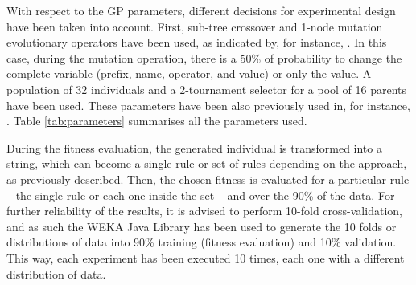 \documentclass[runningheads]{llncs}
\begin{document}
With respect to the GP parameters, different decisions for experimental design have been taken into account. 
First, sub-tree crossover and 1-node mutation evolutionary operators have
been used, as indicated by, for instance, \cite{EvoStar2014:GPBot}. In this case, during the
mutation operation, there is a 50\% of probability to change the complete variable (prefix, name, operator, and value) or only the value. A population of 32 individuals and a 2-tournament selector for a pool of
16 parents have been used. These parameters have been also previously
used in, for instance, \cite{EvoStar2014:GPBot}. Table \ref{tab:parameters} summarises all the parameters used.
%
\begin{table}
\begin{center}
\caption{Parameters used in the experiments.}
\label{tab:parameters}
\end{center}
\end{table}

During the fitness evaluation, the generated individual is transformed
into a string, which can become a single rule or set of rules
depending on the approach, as previously described. %
Then, the chosen fitness is evaluated for a particular rule -- the single rule or each one inside the set -- and over the 90\% of the data.
For further reliability of the results, it is advised to perform
10-fold cross-validation, and as such the WEKA 
Java Library \cite{HallWEKA09} has been used to generate the 10 folds
or distributions of data into 90\% training (fitness evaluation) and
10\% validation. This way, each experiment has been executed 10 times,
each one with a different distribution of data.
\end{document}
